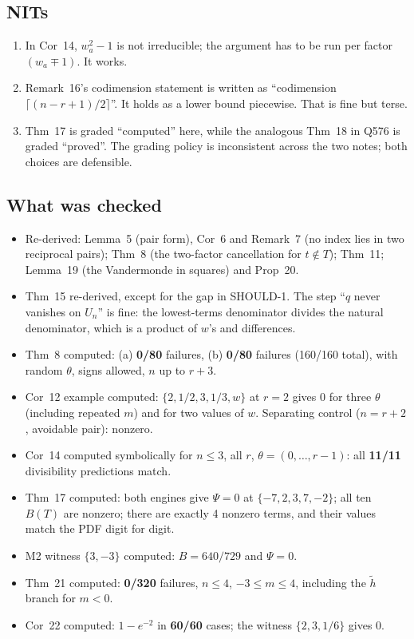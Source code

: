 \documentclass[11pt]{amsart}
\begin{document}
\subsection*{NITs}
\begin{enumerate}[leftmargin=2em]
\item In Cor~14, $w_a^2-1$ is not irreducible; the argument has to be run per factor
$(w_a\mp1)$. It works.
\item Remark~16's codimension statement is written as ``codimension $\lceil(n-r+1)/2\rceil$''. It
holds as a lower bound piecewise. That is fine but terse.
\item Thm~17 is graded ``computed'' here, while the analogous Thm~18 in Q576 is graded ``proved''.
The grading policy is inconsistent across the two notes; both choices are defensible.
\end{enumerate}

\subsection*{What was checked}
\begin{itemize}[leftmargin=2em]
\item Re-derived: Lemma~5 (pair form), Cor~6 and Remark~7 (no index lies in two reciprocal pairs);
Thm~8 (the two-factor cancellation for $t\notin T$); Thm~11; Lemma~19 (the Vandermonde in squares)
and Prop~20.
\item Thm~15 re-derived, except for the gap in SHOULD-1. The step ``$q$ never vanishes on $U_n$''
is fine: the lowest-terms denominator divides the natural denominator, which is a product of
$w$'s and differences.
\item Thm~8 computed: (a) \textbf{0/80} failures, (b) \textbf{0/80} failures (160/160 total), with
random $\theta$, signs allowed, $n$ up to $r+3$.
\item Cor~12 example computed: $\{2,1/2,3,1/3,w\}$ at $r=2$ gives $0$ for three $\theta$ (including
repeated $m$) and for two values of $w$. Separating control ($n=r+2$, avoidable pair): nonzero.
\item Cor~14 computed symbolically for $n\le3$, all $r$, $\theta=(0,\dots,r-1)$: all
\textbf{11/11} divisibility predictions match.
\item Thm~17 computed: both engines give $\Psi=0$ at $\{-7,2,3,7,-2\}$; all ten $B(T)$ are
nonzero; there are exactly 4 nonzero terms, and their values match the PDF digit for digit.
\item M2 witness $\{3,-3\}$ computed: $B=640/729$ and $\Psi=0$.
\item Thm~21 computed: \textbf{0/320} failures, $n\le4$, $-3\le m\le4$, including the
$\tilde h$ branch for $m<0$.
\item Cor~22 computed: $1-e^{-2}$ in \textbf{60/60} cases; the witness $\{2,3,1/6\}$ gives $0$.
\end{itemize}
\end{document}
